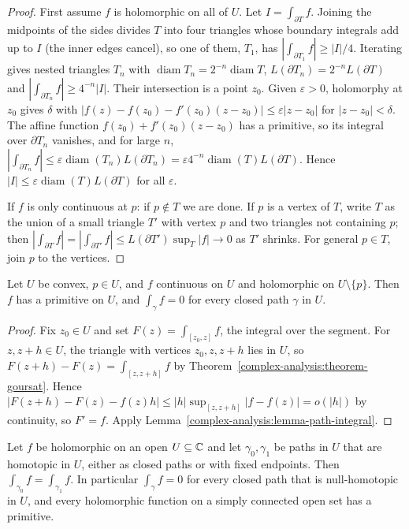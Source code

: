 \begin{proof}
First assume $f$ is holomorphic on all of $U$. Let $I = \int_{\partial T}f$. Joining the midpoints of the sides divides $T$ into four triangles whose boundary integrals add up to $I$ (the inner edges cancel),
so one of them, $T_1$, has $|\int_{\partial T_1}f| \geq |I|/4$. Iterating gives nested triangles $T_n$ with $\operatorname{diam}T_n = 2^{-n}\operatorname{diam}T$, $L(\partial T_n) = 2^{-n}L(\partial T)$ and
$|\int_{\partial T_n}f| \geq 4^{-n}|I|$. Their intersection is a point $z_0$. Given $\varepsilon > 0$, holomorphy at $z_0$ gives $\delta$ with $|f(z) - f(z_0) - f'(z_0)(z - z_0)| \leq \varepsilon|z - z_0|$ for
$|z - z_0| < \delta$. The affine function $f(z_0) + f'(z_0)(z - z_0)$ has a primitive, so its integral over $\partial T_n$ vanishes, and for large $n$,
$|\int_{\partial T_n}f| \leq \varepsilon\operatorname{diam}(T_n)L(\partial T_n) = \varepsilon4^{-n}\operatorname{diam}(T)L(\partial T)$. Hence $|I| \leq \varepsilon\operatorname{diam}(T)L(\partial T)$ for all
$\varepsilon$.

If $f$ is only continuous at $p$: if $p \notin T$ we are done. If $p$ is a vertex of $T$, write $T$ as the union of a small triangle $T'$ with vertex $p$ and two triangles not containing $p$; then
$|\int_{\partial T}f| = |\int_{\partial T'}f| \leq L(\partial T')\sup_T|f| \to 0$ as $T'$ shrinks. For general $p \in T$, join $p$ to the vertices.
\end{proof}

\begin{corollary}\label{complex-analysis:corollary-primitive-convex}
Let $U$ be convex, $p \in U$, and $f$ continuous on $U$ and holomorphic on $U \setminus \{p\}$. Then $f$ has a primitive on $U$, and $\int_\gamma f = 0$ for every closed path $\gamma$ in $U$.
\end{corollary}

\begin{proof}
Fix $z_0 \in U$ and set $F(z) = \int_{[z_0, z]}f$, the integral over the segment. For $z, z + h \in U$, the triangle with vertices $z_0, z, z + h$ lies in $U$, so $F(z + h) - F(z) = \int_{[z, z+h]}f$ by
Theorem~\ref{complex-analysis:theorem-goursat}. Hence $|F(z + h) - F(z) - f(z)h| \leq |h|\sup_{[z, z+h]}|f - f(z)| = o(|h|)$ by continuity, so $F' = f$. Apply Lemma~\ref{complex-analysis:lemma-path-integral}.
\end{proof}

\begin{theorem}\label{complex-analysis:theorem-cauchy-homotopy}
Let $f$ be holomorphic on an open $U \subseteq \mathbb{C}$ and let $\gamma_0, \gamma_1$ be paths in $U$ that are homotopic in $U$, either as closed paths or with fixed endpoints. Then
$\int_{\gamma_0}f = \int_{\gamma_1}f$. In particular $\int_\gamma f = 0$ for every closed path that is null-homotopic in $U$, and every holomorphic function on a simply connected open set has a primitive.
\end{theorem}

